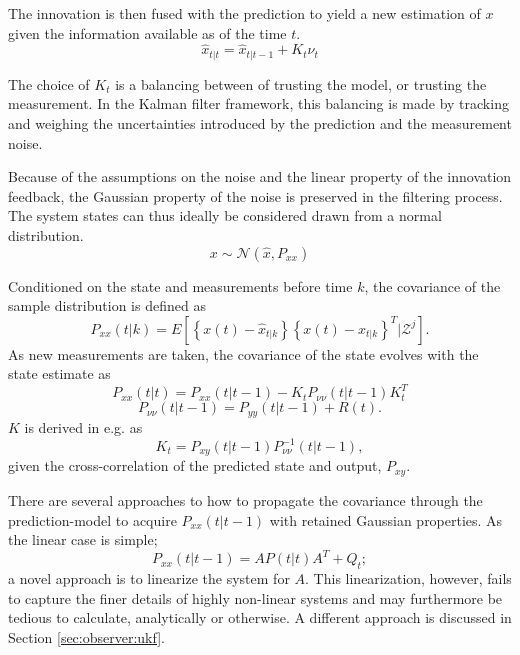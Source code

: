     The innovation is then fused with the prediction to yield a new
    estimation \citep{gustafsson2010statistical} of $x$ given the
    information available as of the time $t$.
    \begin{equation}
        \hat{x}_{t|t} = \hat{x}_{t|t-1} + K_{t}\nu_{t}
    \end{equation}

    The choice of $K_{t}$ is a balancing between of trusting the model,
    or trusting the measurement. In the Kalman filter framework,
    this balancing is made by tracking and weighing the uncertainties
    introduced by the prediction and the measurement noise.

    Because of the assumptions on the noise and the linear property
    of the innovation feedback, the Gaussian property of the noise is preserved
    in the filtering process. The system states can thus ideally
    be considered drawn from a normal distribution.
    \begin{equation}
        x \sim \mathcal{N}\left(\hat{x}, P_{xx}\right)
    \end{equation}

    Conditioned on the state and measurements before time $k$, the
    covariance of the sample distribution is defined as
    \begin{equation}
        P_{xx}(t|k) = E \left[ \left\lbrace x(t) - \hat{x}_{t|k} \right\rbrace
                               \left\lbrace x(t) - \hat{x}_{t|k} \right\rbrace^{T}
                               | \mathcal{Z}^{j} \right] .
    \end{equation}
    As new measurements are taken, the covariance of the state evolves
    \citep{Julier95anewapproach} with the state estimate as
    \begin{equation}
        P_{xx}(t|t) = P_{xx}(t|t-1) - K_{t}P_{\nu\nu}(t|t-1)K_{t}^{T}
    \end{equation}
    \begin{equation}
        \label{eq:observer:filtering:pnunu}
        P_{\nu\nu}(t|t-1) = P_{yy}(t|t-1) + R(t) .
    \end{equation}
    $K$ is derived in e.g. \citep{gustafsson2010statistical} as
    \begin{equation}
        \label{eq:observer:filtering:pxy}
        K_{t} = P_{xy}(t|t-1)P_{\nu\nu}^{-1}(t|t-1),
    \end{equation}
    given the cross-correlation of the predicted state and output, $P_{xy}$.

    There are several approaches to how to propagate the covariance
    through the prediction-model to acquire $P_{xx}(t|t-1)$ with retained Gaussian properties.
    As the linear case is simple;
    \begin{equation}
        P_{xx}(t|t-1) = AP(t|t)A^{T} + Q_{t};
    \end{equation}
    a novel approach is to linearize the system for $A$.
    This linearization, however, fails to capture the finer details
    of highly non-linear systems and may furthermore be tedious to
    calculate, analytically or otherwise. A different approach is
    discussed in Section \ref{sec:observer:ukf}.
